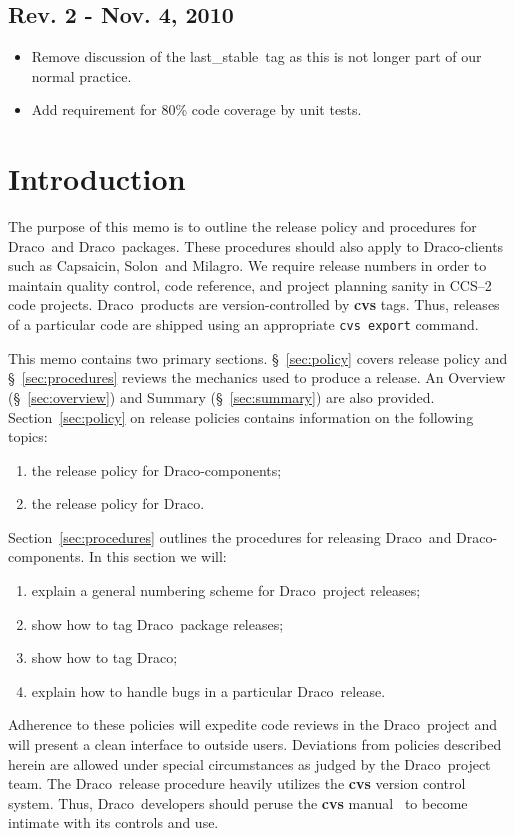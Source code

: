 \documentclass[11pt]{nmemo}
\newcommand{\draco}{{\normalfont\normalsize\sffamily Draco}}
\newcommand{\milagro}{{\normalfont\normalsize\sffamily Milagro}}
\newcommand{\solon}{{\normalfont\normalsize\sffamily Solon}}
\newcommand{\capsaicin}{{\normalfont\normalsize\sffamily Capsaicin}}
\newcommand{\stable}{{\normalfont\normalsize\ttfamily last\_stable}}
\begin{document}
\subsection*{Rev. 2 - Nov. 4, 2010}
\begin{itemize}
\item Remove discussion of the \stable\ tag as this is not longer part
  of our normal practice.
\item Add requirement for 80\% code coverage by unit tests.
\end{itemize}

\section{Introduction}

The purpose of this memo is to outline the release policy and
procedures for \draco\ and \draco\ packages.  These procedures should
also apply to \draco-clients such as \capsaicin, \solon\ and \milagro.
We require release numbers in order to maintain quality control, code
reference, and project planning sanity in CCS--2 code projects.
\draco\ products are version-controlled by {\bf cvs} tags.  Thus,
releases of a particular code are shipped using an appropriate
\texttt{cvs export} command.

This memo contains two primary sections. \S~\ref{sec:policy} covers
release policy and \S~\ref{sec:procedures} reviews the mechanics used
to produce a release.  An Overview (\S~\ref{sec:overview}) and Summary
(\S~\ref{sec:summary}) are also provided.  Section~\ref{sec:policy} on
release policies contains information on the following topics:
\begin{enumerate}
\item the release policy for \draco-components;
\item the release policy for \draco.
\end{enumerate}
Section~\ref{sec:procedures} outlines the procedures for releasing
\draco\ and \draco-components.  In this section we will:
\begin{enumerate}
\item explain a general numbering scheme for \draco\ project releases;
\item show how to tag \draco\ package releases;
\item show how to tag \draco;
\item explain how to handle bugs in a particular \draco\ release.
\end{enumerate}
Adherence to these policies will expedite code reviews in the \draco\ 
project and will present a clean interface to outside users.
Deviations from policies described herein are allowed under special
circumstances as judged by the \draco\ project team.  The \draco\ 
release procedure heavily utilizes the {\bf cvs} version control
system.  Thus, \draco\ developers should peruse the {\bf cvs}
manual~\cite{cvs} to become intimate with its controls and use.
\end{document}
